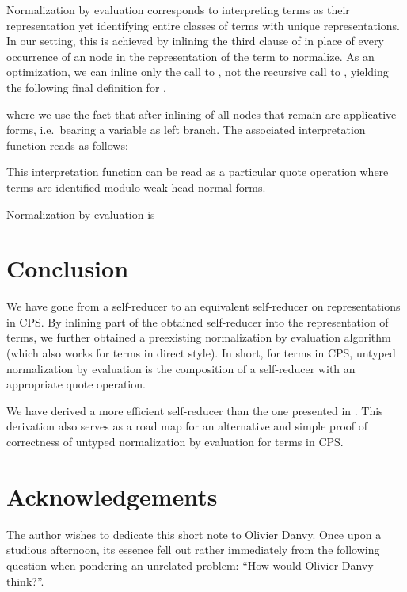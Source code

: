 \documentclass[a4paper]{amsart}
\begin{document}
Normalization by evaluation corresponds to interpreting terms as their
representation yet identifying entire classes of terms with unique
representations. In our setting, this is achieved by inlining the third clause
of  in place of every occurrence of an  node in the
representation of the term to normalize. As an optimization, we can inline
only the call to , not the recursive call to , yielding the
following final definition for ,

where we use the fact that after inlining of  all  nodes
that remain are applicative forms, i.e.\ bearing a variable as left branch.
The associated interpretation function reads as follows:

This interpretation function can be read as a particular quote operation where
terms are identified modulo weak head normal forms.

Normalization by evaluation is


\section{Conclusion}

We have gone from a self-reducer to an equivalent self-reducer on
representations in CPS. By inlining part of the obtained self-reducer into the
representation of terms, we further obtained a preexisting normalization by
evaluation algorithm (which also works for terms in direct style). In short,
for terms in CPS, untyped normalization by evaluation is the composition of a
self-reducer with an appropriate quote operation.

We have derived a more efficient self-reducer than the one presented in
\citep{mogensen:selfint}. This derivation also serves as a road map for an
alternative and simple proof of correctness of untyped normalization by
evaluation for terms in CPS.

\section*{Acknowledgements}

The author wishes to dedicate this short note to Olivier Danvy. Once upon a
studious afternoon, its essence fell out rather immediately from the following
question when pondering an unrelated problem: ``How would Olivier Danvy
think?''.



\end{document}
